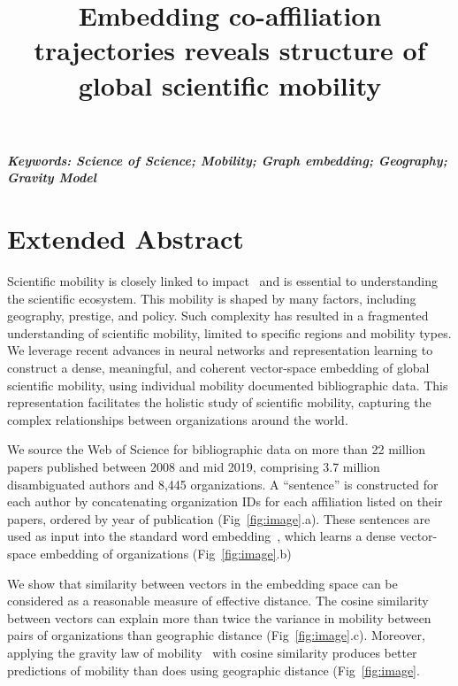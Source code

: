 \documentclass[a4paper,12pt]{article}
\title{Embedding co-affiliation trajectories reveals structure of global scientific mobility}
\author[]{} %
\date{}
\begin{document}
\maketitle
\thispagestyle{fancy}

\vspace{-6em}
\begin{center}
\textbf{\textit{Keywords: Science of Science; Mobility; Graph embedding; Geography; Gravity Model}}
\newline
\end{center}

\section*{Extended Abstract}

Scientific mobility is closely linked to impact~\autocite{sugimoto_scientists_2017} and is essential to understanding the scientific ecosystem.
This mobility is shaped by many factors, including geography, prestige, and policy\autocite{deville_career_2014}.
Such complexity has resulted in a fragmented understanding of scientific mobility, limited to specific regions and mobility types.
We leverage recent advances in neural networks and representation learning to construct a dense, meaningful, and coherent vector-space embedding of global scientific mobility, using individual mobility documented bibliographic data. 
This representation facilitates the holistic study of scientific mobility, capturing the complex relationships between organizations around the world. 

We source the Web of Science for bibliographic data on more than 22 million papers published between 2008 and mid 2019, comprising 3.7 million disambiguated authors and 8,445 organizations. 
A ``sentence'' is constructed for each author by concatenating organization IDs for each affiliation listed on their papers, ordered by year of publication (Fig~\ref{fig:image}.a).
These sentences are used as input into the standard word embedding~\autocite{mikolov_distributed_2013}, which learns a dense vector-space embedding of organizations (Fig~\ref{fig:image}.b) 

We show that similarity between vectors in the embedding space can be considered as a reasonable measure of effective distance. 
The cosine similarity between vectors can explain more than twice the variance in mobility between pairs of organizations than geographic distance (Fig~\ref{fig:image}.c). 
Moreover, applying the gravity law of mobility~\cite{simini_universal_2012} with cosine similarity produces better predictions of mobility than does using geographic distance (Fig~\ref{fig:image}.
\end{document}
